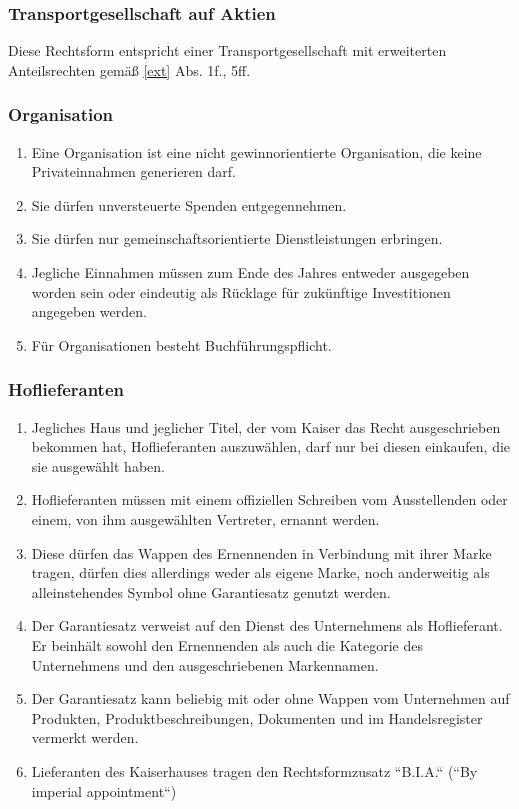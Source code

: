 \documentclass{article}
\begin{document}
\subsubsection{Transportgesellschaft auf Aktien}
Diese Rechtsform entspricht einer Transportgesellschaft mit erweiterten Anteilsrechten gemäß \ref{ext} Abs. 1f., 5ff.

\subsubsection{Organisation}
\begin{enumerate}[(1)]
    \item Eine Organisation ist eine nicht gewinnorientierte Organisation, die keine Privateinnahmen generieren darf.
    \item Sie dürfen unversteuerte Spenden entgegennehmen.
    \item Sie dürfen nur gemeinschaftsorientierte Dienstleistungen erbringen.
    \item Jegliche Einnahmen müssen zum Ende des Jahres entweder ausgegeben worden sein oder eindeutig als Rücklage für zukünftige Investitionen angegeben werden.
    \item Für Organisationen besteht Buchführungspflicht. 
\end{enumerate}

\subsubsection{Hoflieferanten}
\begin{enumerate}[(1)]
    \item Jegliches Haus und jeglicher Titel, der vom Kaiser das Recht ausgeschrieben bekommen hat, Hoflieferanten auszuwählen, darf nur bei diesen einkaufen, die sie ausgewählt haben.
    \item Hoflieferanten müssen mit einem offiziellen Schreiben vom Ausstellenden oder einem, von ihm ausgewählten Vertreter, ernannt werden.
    \item Diese dürfen das Wappen des Ernennenden in Verbindung mit ihrer Marke tragen, dürfen dies allerdings weder als eigene Marke, noch anderweitig als alleinstehendes Symbol ohne Garantiesatz genutzt werden.
    \item Der Garantiesatz verweist auf den Dienst des Unternehmens als Hoflieferant. Er beinhält sowohl den Ernennenden als auch die Kategorie des Unternehmens und den ausgeschriebenen Markennamen.
    \item Der Garantiesatz kann beliebig mit oder ohne Wappen vom Unternehmen auf Produkten, Produktbeschreibungen, Dokumenten und im Handelsregister vermerkt werden.
    \item Lieferanten des Kaiserhauses tragen den Rechtsformzusatz ``B.I.A.`` (``By imperial appointment``)
\end{enumerate}
\end{document}
